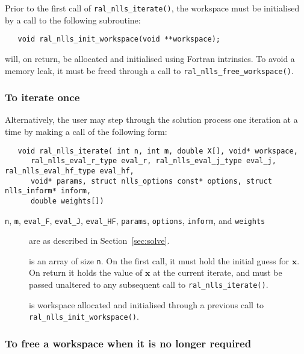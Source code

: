 \documentclass{spec}
\begin{document}
Prior to the first call of \texttt{ral\_nlls\_iterate()}, the workspace must be
initialised by a call to the following subroutine:
\begin{verbatim}
   void ral_nlls_init_workspace(void **workspace);
\end{verbatim}

\begin{description}
    will, on return, be allocated and initialised using Fortran intrinsics.
      To avoid a memory leak, it must be freed through a call to \texttt{ral\_nlls\_free\_workspace()}.
\end{description}

\subsubsection{To iterate once}
\label{sec:iterate}
Alternatively, the user may step through the solution process one iteration at
a time by making a call of the following form:

\begin{verbatim}
   void ral_nlls_iterate( int n, int m, double X[], void* workspace,
      ral_nlls_eval_r_type eval_r, ral_nlls_eval_j_type eval_j, ral_nlls_eval_hf_type eval_hf,
      void* params, struct nlls_options const* options, struct nlls_inform* inform,
      double weights[])
\end{verbatim}

\begin{description}

\item[\normalfont \texttt{n}, \texttt{m}, \texttt{eval\_F}, \texttt{eval\_J}, \texttt{eval\_HF}, \texttt{params}, \texttt{options}, \texttt{inform}, and \texttt{weights}] are as described in Section~\ref{sec:solve}.

 is an array of size {\tt n}. On the first call, it must hold the initial guess for
$\bm x$. On return it holds the value of $\bm x$ at the current iterate, and
must be passed unaltered to any subsequent call to \texttt{ral\_nlls\_iterate()}.

 is workspace allocated and initialised through a previous call to
\texttt{ral\_nlls\_init\_workspace()}.

\end{description}

\subsubsection{To free a workspace when it is no longer required}
\end{document}
